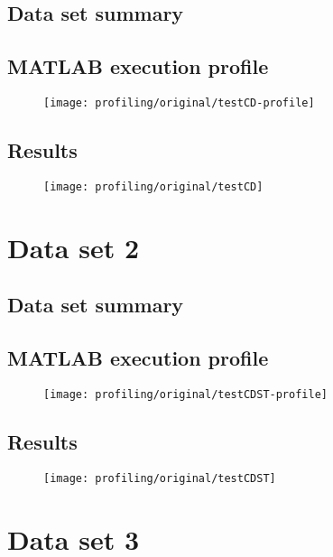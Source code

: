 \subsection{Data set summary}

\subsection{MATLAB execution profile}
\begin{figure}[H]
	\centering
	\texttt{[image: profiling/original/testCD-profile]}
\end{figure}

\subsection{Results}
\begin{figure}[H]
	\centering
	\texttt{[image: profiling/original/testCD]}
\end{figure}

\section{Data set 2}

\subsection{Data set summary}

\subsection{MATLAB execution profile}
\begin{figure}[H]
	\centering
	\texttt{[image: profiling/original/testCDST-profile]}
\end{figure}

\subsection{Results}
\begin{figure}[H]
	\centering
	\texttt{[image: profiling/original/testCDST]}
\end{figure}

\section{Data set 3}

